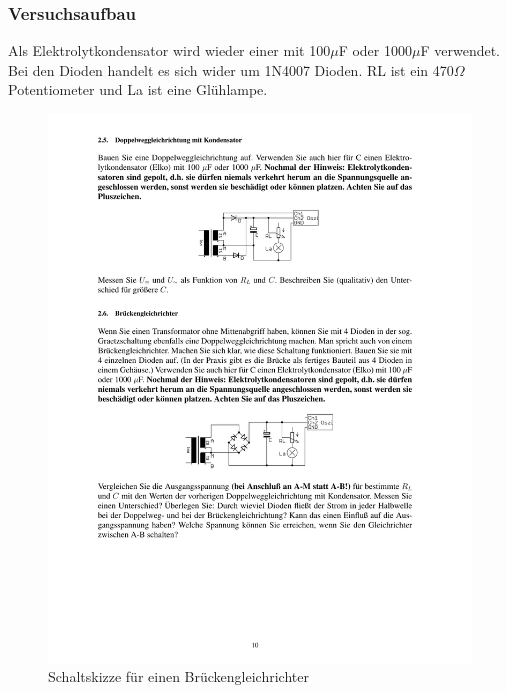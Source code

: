 \documentclass[12pt,a4paper]{article}
\begin{document}
\subsubsection{Versuchsaufbau}
Als Elektrolytkondensator wird wieder einer mit 100$\mu$F oder 1000$\mu$F verwendet. Bei den Dioden handelt es sich wider um 1N4007 Dioden. RL ist ein 470$\Omega$ Potentiometer und La ist eine Glühlampe.
\begin{figure}[H] 
  \centering
    \includegraphics[trim = 10mm 100mm 10mm 150mm, clip, scale = 1]{ep2_14[Page10].pdf}
  	\caption[Schaltskizze für einen Brückengleichrichter]{Schaltskizze für einen Brückengleichrichter\footnotemark}
  \label{fig:2_7}
\end{figure}
\end{document}
